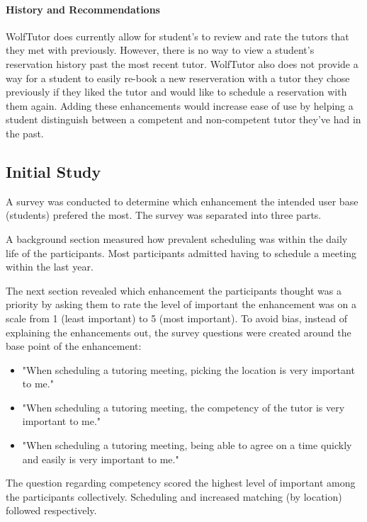 \paragraph{History and Recommendations}
WolfTutor does currently allow for student's to review and rate the tutors that they met with previously. However, there is no way to view a student's reservation history past the most recent tutor. WolfTutor also does not provide a way for a student to easily re-book a new reserveration with a tutor they chose previously if they liked the tutor and would like to schedule a reservation with them again. Adding these enhancements would increase ease of use by helping a student distinguish between a competent and non-competent tutor they've had in the past. 

\subsection{Initial Study}
\label{sec:initial-study}
A survey was conducted to determine which enhancement the intended user base (students) prefered the most. The survey was separated into three parts. 

A background section measured how prevalent scheduling was within the daily life of the participants. Most participants admitted having to schedule a meeting within the last year. 

The next section revealed which enhancement the participants thought was a priority by asking them to rate the level of important the enhancement was on a scale from 1 (least important) to 5 (most important). To avoid bias, instead of explaining the enhancements out, the survey questions were created around the base point of the enhancement:
\begin{itemize}
  \item "When scheduling a tutoring meeting, picking the location is very important to me."
  \item "When scheduling a tutoring meeting, the competency of the tutor is very important to me."
  \item "When scheduling a tutoring meeting, being able to agree on a time quickly and easily is very important to me."
\end{itemize}
The question regarding competency scored the highest level of important among the participants collectively. Scheduling and increased matching (by location) followed respectively.

